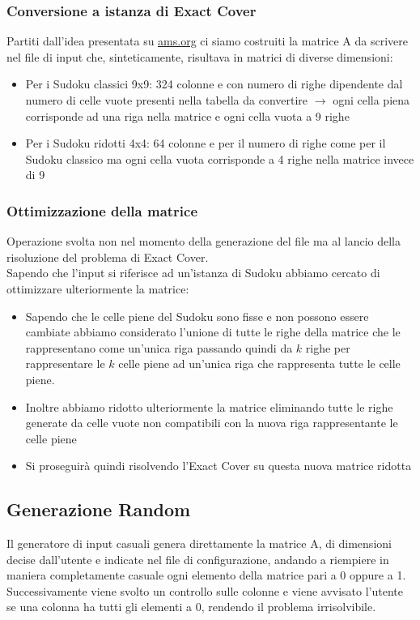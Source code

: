 \subsubsection{Conversione a istanza di Exact Cover}
Partiti dall'idea presentata su \href{http://www.ams.org/publicoutreach/feature-column/fcarc-kanoodle}{\underline{ams.org}} ci siamo costruiti la matrice A da scrivere nel file di input che, sinteticamente, risultava in matrici di diverse dimensioni:
\begin{itemize}
    \item Per i Sudoku classici 9x9: 324 colonne e con numero di righe dipendente dal numero di celle vuote presenti nella tabella da convertire $\rightarrow$ ogni cella piena corrisponde ad una riga nella matrice e ogni cella vuota a 9 righe
    \item Per i Sudoku ridotti 4x4: 64 colonne e per il numero di righe come per il Sudoku classico ma ogni cella vuota corrisponde a 4 righe nella matrice invece di 9
\end{itemize}

\subsubsection{Ottimizzazione della matrice}
Operazione svolta non nel momento della generazione del file ma al lancio della risoluzione del problema di Exact Cover.\\
Sapendo che l'input si riferisce ad un'istanza di Sudoku abbiamo cercato di ottimizzare ulteriormente la matrice:
\begin{itemize}
    \item Sapendo che le celle piene del Sudoku sono fisse e non possono essere cambiate abbiamo considerato l'unione di tutte le righe della matrice che le rappresentano come un'unica riga passando quindi da $k$ righe per rappresentare le $k$ celle piene ad un'unica riga che rappresenta tutte le celle piene.
    \item Inoltre abbiamo ridotto ulteriormente la matrice eliminando tutte le righe generate da celle vuote non compatibili con la nuova riga rappresentante le celle piene
    \item Si proseguirà quindi risolvendo l'Exact Cover su questa nuova matrice ridotta
\end{itemize}

\subsection{Generazione Random}
Il generatore di input casuali genera direttamente la matrice A, di dimensioni decise dall’utente e indicate nel file di configurazione, andando a riempiere in maniera completamente casuale ogni elemento della matrice pari a 0 oppure a 1.
Successivamente viene svolto un controllo sulle colonne e viene avvisato l’utente se una colonna ha tutti gli elementi a 0, rendendo il problema irrisolvibile.
